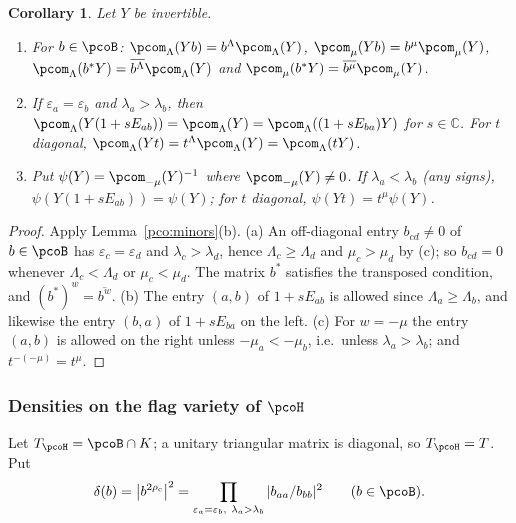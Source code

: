 \documentclass[10pt]{amsart}
\newtheorem{corollary}[theorem]{Corollary}
\theoremstyle{definition}
\theoremstyle{remark}
\newcommand{\C}{\mathbb C}
\begin{document}
\begin{corollary}\label{pco:equiv}
Let $Y$ be invertible.
\begin{enumerate}
\item[(a)] For $b\in\pcoB$: $\pcom_\Lambda(Yb)=b^\Lambda\pcom_\Lambda(Y)$, $\pcom_\mu(Yb)=
b^\mu\pcom_\mu(Y)$, $\pcom_\Lambda(b^*Y)=\overline{b^\Lambda}\pcom_\Lambda(Y)$ and $\pcom_\mu(b^*Y)
=\overline{b^\mu}\pcom_\mu(Y)$.
\item[(b)] If $\varepsilon_a=\varepsilon_b$ and $\lambda_a>\lambda_b$, then $\pcom_\Lambda(Y(1+sE_{ab}))
=\pcom_\Lambda(Y)=\pcom_\Lambda((1+sE_{ba})Y)$ for $s\in\C$. For $t$ diagonal,
$\pcom_\Lambda(Yt)=t^\Lambda\pcom_\Lambda(Y)=\pcom_\Lambda(tY)$.
\item[(c)] Put $\psi(Y)=\pcom_{-\mu}(Y)^{-1}$ where $\pcom_{-\mu}(Y)\ne0$. If $\lambda_a<\lambda_b$
\textup(any signs\textup), $\psi(Y(1+sE_{ab}))=\psi(Y)$; for $t$ diagonal, $\psi(Yt)=t^\mu\psi(Y)$.
\end{enumerate}
\end{corollary}
\begin{proof}
Apply Lemma~\ref{pco:minors}(b). (a) An off-diagonal entry $b_{cd}\ne0$ of $b\in\pcoB$ has
$\varepsilon_c=\varepsilon_d$ and $\lambda_c>\lambda_d$, hence $\Lambda_c\ge\Lambda_d$ and $\mu_c>
\mu_d$ by (c); so $b_{cd}=0$ whenever $\Lambda_c<\Lambda_d$ or $\mu_c<\mu_d$. The matrix $b^*$
satisfies the transposed condition, and $(b^*)^w=\overline{b^w}$. (b) The entry $(a,b)$ of
$1+sE_{ab}$ is allowed since $\Lambda_a\ge\Lambda_b$, and likewise the entry $(b,a)$ of $1+sE_{ba}$
on the left. (c) For $w=-\mu$ the entry $(a,b)$ is allowed on the right unless $-\mu_a<-\mu_b$,
i.e.\ unless $\lambda_a>\lambda_b$; and $t^{-(-\mu)}=t^\mu$.
\end{proof}

\subsubsection{Densities on the flag variety of $\pcoH$}\label{pco:ss-density}
Let $T_{\pcoH}=\pcoB\cap K$; a unitary triangular matrix is diagonal, so $T_{\pcoH}=T$. Put
\[
\delta(b)=\bigl|b^{2\rho_{\mathrm c}}\bigr|^2=\prod_{\varepsilon_a=\varepsilon_b,\ \lambda_a>\lambda_b}
|b_{aa}/b_{bb}|^2\qquad(b\in\pcoB).
\]
\end{document}

